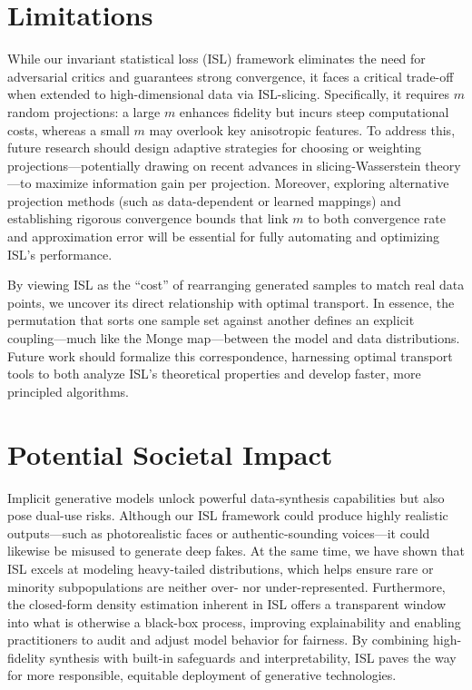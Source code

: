 \documentclass{article}
\begin{document}
\section{Limitations}

While our invariant statistical loss (ISL) framework eliminates the need for adversarial critics and guarantees strong convergence, it faces a critical trade-off when extended to high-dimensional data via ISL-slicing. Specifically, it requires $m$ random projections: a large $m$ enhances fidelity but incurs steep computational costs, whereas a small $m$ may overlook key anisotropic features. To address this, future research should design adaptive strategies for choosing or weighting projections—potentially drawing on recent advances in slicing-Wasserstein theory—to maximize information gain per projection. Moreover, exploring alternative projection methods (such as data-dependent or learned mappings) and establishing rigorous convergence bounds that link $m$  to both convergence rate and approximation error will be essential for fully automating and optimizing ISL’s performance.

By viewing ISL as the “cost” of rearranging generated samples to match real data points, we uncover its direct relationship with optimal transport. In essence, the permutation that sorts one sample set against another defines an explicit coupling—much like the Monge map—between the model and data distributions. Future work should formalize this correspondence, harnessing optimal transport tools to both analyze ISL’s theoretical properties and develop faster, more principled algorithms.



\section{Potential Societal Impact}

Implicit generative models unlock powerful data‐synthesis capabilities but also pose dual-use risks. Although our ISL framework could produce highly realistic outputs—such as photorealistic faces or authentic-sounding voices—it could likewise be misused to generate deep fakes. At the same time, we have shown that ISL excels at modeling heavy-tailed distributions, which helps ensure rare or minority subpopulations are neither over- nor under-represented. Furthermore, the closed-form density estimation inherent in ISL offers a transparent window into what is otherwise a black-box process, improving explainability and enabling practitioners to audit and adjust model behavior for fairness. By combining high-fidelity synthesis with built-in safeguards and interpretability, ISL paves the way for more responsible, equitable deployment of generative technologies.
\end{document}
